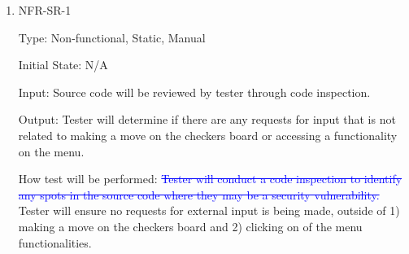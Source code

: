\documentclass[12pt, titlepage]{article}
\begin{document}
\begin{enumerate}

\item{NFR-SR-1\\}

Type: Non-functional, Static, Manual
					
Initial State: N/A
					
Input: Source code will be reviewed by tester through code inspection.
					
Output: Tester will determine if there are any requests for input that is not related to making a move on the checkers board or accessing a functionality on the menu.
					
How test will be performed: \textcolor{blue}{\sout{Tester will conduct a code inspection to identify any spots in the source code where they may be a security vulnerability.}} Tester will ensure no requests for external input is being made, outside of 1) making a move on the checkers board and 2) clicking on of the menu functionalities.
\end{enumerate}
\end{document}
